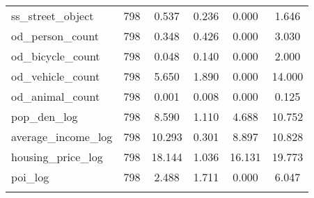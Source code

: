 \begin{table}[!htbp]
\begin{tabular}{@{\extracolsep{5pt}}lccccc}
ss\_street\_object & 798 & 0.537 & 0.236 & 0.000 & 1.646 \\ 
od\_person\_count & 798 & 0.348 & 0.426 & 0.000 & 3.030 \\ 
od\_bicycle\_count & 798 & 0.048 & 0.140 & 0.000 & 2.000 \\ 
od\_vehicle\_count & 798 & 5.650 & 1.890 & 0.000 & 14.000 \\ 
od\_animal\_count & 798 & 0.001 & 0.008 & 0.000 & 0.125 \\ 
pop\_den\_log & 798 & 8.590 & 1.110 & 4.688 & 10.752 \\ 
average\_income\_log & 798 & 10.293 & 0.301 & 8.897 & 10.828 \\ 
housing\_price\_log & 798 & 18.144 & 1.036 & 16.131 & 19.773 \\ 
poi\_log & 798 & 2.488 & 1.711 & 0.000 & 6.047 \\ 
\hline \\[-1.8ex] 
\end{tabular} 
\end{table} 
